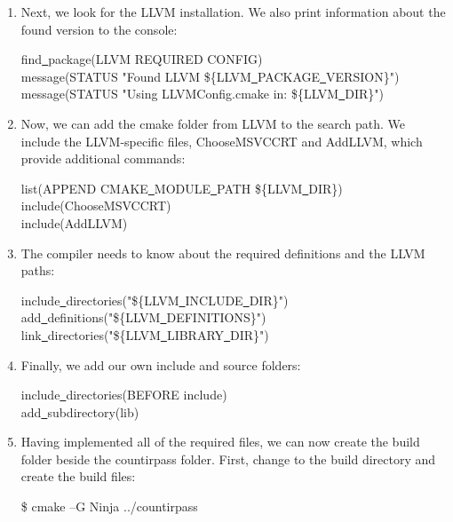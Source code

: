 \begin{enumerate}
	\item Next, we look for the LLVM installation. We also print information about the found version to the console:
	\begin{tcolorbox}[colback=white,colframe=black]
		find\underline{~}package(LLVM REQUIRED CONFIG) \\
		message(STATUS "Found LLVM \$\{LLVM\underline{~}PACKAGE\underline{~}VERSION\}") \\
		message(STATUS "Using LLVMConfig.cmake in: \$\{LLVM\underline{~}DIR\}")
	\end{tcolorbox}
	
	\item Now, we can add the cmake folder from LLVM to the search path. We include the LLVM-specific files, ChooseMSVCCRT and AddLLVM, which provide additional commands:
	\begin{tcolorbox}[colback=white,colframe=black]
		list(APPEND CMAKE\underline{~}MODULE\underline{~}PATH \$\{LLVM\underline{~}DIR\}) \\
		include(ChooseMSVCCRT) \\
		include(AddLLVM)
	\end{tcolorbox}
	
	\item The compiler needs to know about the required definitions and the LLVM paths:
	\begin{tcolorbox}[colback=white,colframe=black]
		include\underline{~}directories("\$\{LLVM\underline{~}INCLUDE\underline{~}DIR\}") \\
		add\underline{~}definitions("\$\{LLVM\underline{~}DEFINITIONS\}") \\
		link\underline{~}directories("\$\{LLVM\underline{~}LIBRARY\underline{~}DIR\}")
	\end{tcolorbox}
	
	\item Finally, we add our own include and source folders:
	\begin{tcolorbox}[colback=white,colframe=black]
		include\underline{~}directories(BEFORE include) \\
		add\underline{~}subdirectory(lib)
	\end{tcolorbox}
	
	\item Having implemented all of the required files, we can now create the build folder beside the countirpass folder. First, change to the build directory and create the build files:
	\begin{tcolorbox}[colback=white,colframe=black]
		\$ cmake –G Ninja ../countirpass
	\end{tcolorbox}
	

\end{enumerate}
